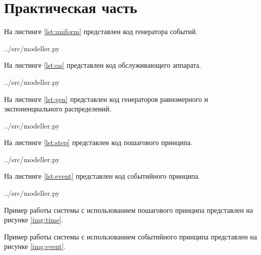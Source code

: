 \chapter{Практическая часть}

На листинге \ref{lst:uniform} представлен код генератора событий.

\begin{lstinputlisting}[label=lst:uniform,caption=Генератор событий, language=python, firstline=23, lastline=43]{../src/modeller.py}
\end{lstinputlisting}

На листинге \ref{lst:oa} представлен код обслуживающего аппарата.

\begin{lstinputlisting}[label=lst:oa,caption=Обслуживающий аппарат, language=python, firstline=45, lastline=86]{../src/modeller.py}
\end{lstinputlisting}

На листинге \ref{lst:gen} представлен код генераторов равномерного и экспоненциального распределений.

\begin{lstinputlisting}[label=lst:gen,caption=Генераторы, language=python, firstline=4, lastline=20]{../src/modeller.py}
\end{lstinputlisting}

На листинге \ref{lst:step} представлен код пошагового принципа.

\begin{lstinputlisting}[label=lst:step,caption=Пошаговый принцип, language=python, firstline=115, lastline=135]{../src/modeller.py}
\end{lstinputlisting}

На листинге \ref{lst:event} представлен код событийного принципа.

\begin{lstinputlisting}[label=lst:event,caption=Событийный принцип, language=python, firstline=95, lastline=113]{../src/modeller.py}
\end{lstinputlisting}

Пример работы системы с использованием пошагового принципа представлен на рисунке \ref{img:time}. 


Пример работы системы с использованием событийного принципа представлен на рисунке \ref{img:event}. 



